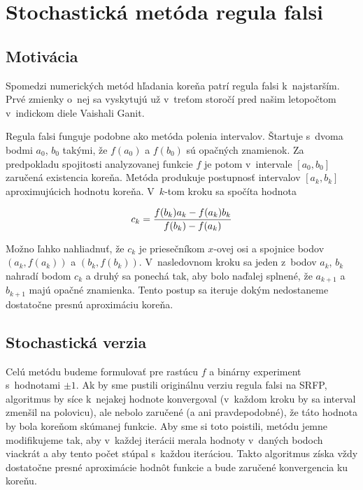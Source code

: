 \section{Stochastická metóda regula falsi}
\subsection{Motivácia}
Spomedzi numerických metód hľadania koreňa patrí regula falsi k~najstarším.
Prvé zmienky o~nej sa vyskytujú už v~treťom storočí pred našim letopočtom
v~indickom diele Vaishali Ganit. 

Regula falsi funguje podobne ako metóda polenia intervalov. Štartuje s~dvoma
bodmi $a_0$, $b_0$ takými, že $f(a_0)$ a $f(b_0)$ sú opačných znamienok. Za
predpokladu spojitosti analyzovanej funkcie $f$ je potom v~intervale 
$[a_0,b_0]$ zaručená existencia koreňa. Metóda produkuje postupnosť intervalov
$[a_k, b_k]$ aproximujúcich hodnotu koreňa. V~$k$-tom kroku sa spočíta hodnota

\[c_k = {f(b_k)a_k - f(a_k)b_k\over f(b_k) - f(a_k)} \label{regula:iter}\]

Možno ľahko nahliadnuť, že $c_k$ je priesečníkom $x$-ovej osi a spojnice bodov
$(a_k, f(a_k))$ a $(b_k, f(b_k))$. V~nasledovnom kroku sa jeden z~bodov $a_k$,
$b_k$ nahradí bodom $c_k$ a druhý sa ponechá tak, aby bolo naďalej splnené, že
$a_{k+1}$ a $b_{k+1}$ majú opačné znamienka. Tento postup sa iteruje dokým
nedostaneme dostatočne presnú aproximáciu koreňa.

\subsection{Stochastická verzia}
Celú metódu budeme formulovať pre rastúcu $f$ a binárny experiment s~hodnotami
$\pm 1$. Ak by sme pustili originálnu verziu regula falsi na SRFP, algoritmus by
síce k~nejakej hodnote konvergoval (v~každom kroku by sa interval zmenšil na
polovicu), ale nebolo zaručené (a ani pravdepodobné), že táto hodnota by bola
koreňom skúmanej funkcie. Aby sme si toto poistili, metódu jemne modifikujeme
tak, aby v~každej iterácii merala hodnoty v~daných bodoch viackrát a aby tento
počet stúpal s~každou iteráciou. Takto algoritmus získa vždy dostatočne presné
aproximácie hodnôt funkcie a bude zaručené konvergencia ku koreňu.

